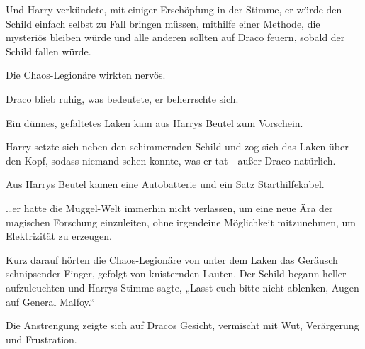 Und Harry verkündete, mit einiger Erschöpfung in der Stimme, er würde den Schild einfach selbst zu Fall bringen müssen, mithilfe einer Methode, die mysteriös bleiben würde und alle anderen sollten auf Draco feuern, sobald der Schild fallen würde.

Die Chaos-Legionäre wirkten nervös.

Draco blieb ruhig, was bedeutete, er beherrschte sich.

Ein dünnes, gefaltetes Laken kam aus Harrys Beutel zum Vorschein.

Harry setzte sich neben den schimmernden Schild und zog sich das Laken über den Kopf, sodass niemand sehen konnte, was er tat—außer Draco natürlich.

Aus Harrys Beutel kamen eine Autobatterie und ein Satz Starthilfekabel.

…er hatte die Muggel-Welt immerhin nicht verlassen, um eine neue Ära der magischen Forschung einzuleiten, ohne irgendeine Möglichkeit mitzunehmen, um Elektrizität zu erzeugen.

Kurz darauf hörten die Chaos-Legionäre von unter dem Laken das Geräusch schnipsender Finger, gefolgt von knisternden Lauten. Der Schild begann heller aufzuleuchten und Harrys Stimme sagte,
„Lasst euch bitte nicht ablenken, Augen auf General Malfoy.“

Die Anstrengung zeigte sich auf Dracos Gesicht, vermischt mit Wut, Verärgerung und Frustration.

